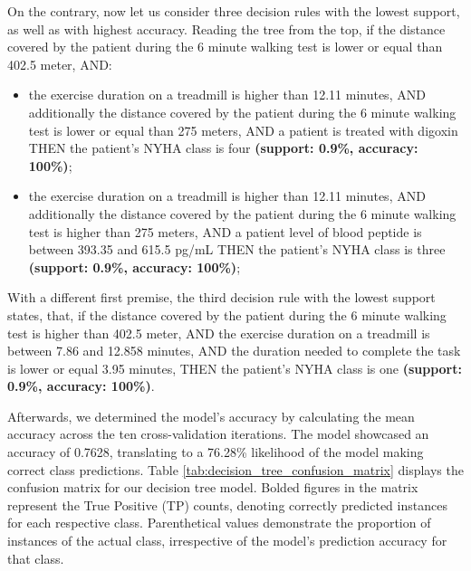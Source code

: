 On the contrary, now let us consider three decision rules with the lowest support, as well as with highest accuracy. Reading the tree from the top, if the distance covered by the patient during the 6 minute walking test is lower or equal than 402.5 meter, AND:
\begin{itemize}
    \item the exercise duration on a treadmill is higher than 12.11 minutes, AND additionally the distance covered by the patient during the 6 minute walking test is lower or equal than 275 meters, AND a patient is treated with digoxin THEN the patient's NYHA class is four \textbf{(support: 0.9\%, accuracy: 100\%)};

    \item the exercise duration on a treadmill is higher than 12.11 minutes, AND additionally the distance covered by the patient during the 6 minute walking test is higher than 275 meters, AND a patient level of blood peptide is between 393.35 and 615.5 pg/mL THEN the patient's NYHA class is three \textbf{(support: 0.9\%, accuracy: 100\%)}; 
\end{itemize}

With a different first premise, the third decision rule with the lowest support states, that, if the distance covered by the patient during the 6 minute walking test is higher than 402.5 meter, AND the exercise duration on a treadmill is between 7.86 and 12.858 minutes, AND the duration needed to complete the task is lower or equal 3.95 minutes, THEN the patient's NYHA class is one \textbf{(support: 0.9\%, accuracy: 100\%)}.

Afterwards, we determined the model's accuracy by calculating the mean accuracy across the ten cross-validation iterations. The model showcased an accuracy of 0.7628, translating to a 76.28\% likelihood of the model making correct class predictions. Table \ref{tab:decision_tree_confusion_matrix} displays the confusion matrix for our decision tree model. Bolded figures in the matrix represent the True Positive (TP) counts, denoting correctly predicted instances for each respective class. Parenthetical values demonstrate the proportion of instances of the actual class, irrespective of the model's prediction accuracy for that class.

